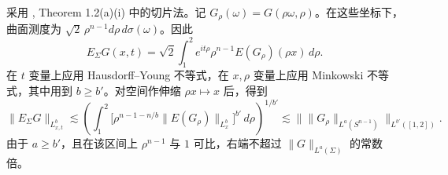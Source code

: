 采用 \cite{r-61}, Theorem 1.2(a)(i) 中的切片法。记 \(G_\rho(\omega)=G(\rho\omega,\rho)\)。在这些坐标下，曲面测度为 \(\sqrt2\,\rho^{n-1}d\rho\,d\sigma(\omega)\)。因此
\[
 E_\Sigma G(x,t)=\sqrt2\int_1^2 e^{it\rho}\rho^{n-1}E(G_\rho)(\rho x)\,d\rho .
\]
在 \(t\) 变量上应用 Hausdorff--Young 不等式，在 \(x,\rho\) 变量上应用 Minkowski 不等式，其中用到 \(b\ge b'\)。对空间作伸缩 \(\rho x\mapsto x\) 后，得到
\[
 \|E_\Sigma G\|_{L^b_{x,t}}\lesssim
 \left(\int_1^2\big[\rho^{n-1-n/b}\|E(G_\rho)\|_{L^b_x}\big]^{b'}\,d\rho\right)^{1/b'}
 \lesssim\big\|\|G_\rho\|_{L^a(S^{n-1})}\big\|_{L^{b'}([1,2])}.
\]
由于 \(a\ge b'\)，且在该区间上 \(\rho^{n-1}\) 与 \(1\) 可比，右端不超过 \(\|G\|_{L^a(\Sigma)}\) 的常数倍。
